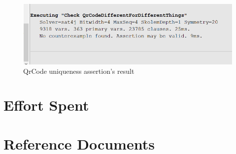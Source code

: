 \documentclass{article}
\begin{document}
\begin{figure}[H]
  \includegraphics[width=\linewidth]{QrCodeAssertion}
  \caption{QrCode uniqueness assertion's result}
  
\end{figure}

\section{Effort Spent}

\section{Reference Documents}
\end{document}
